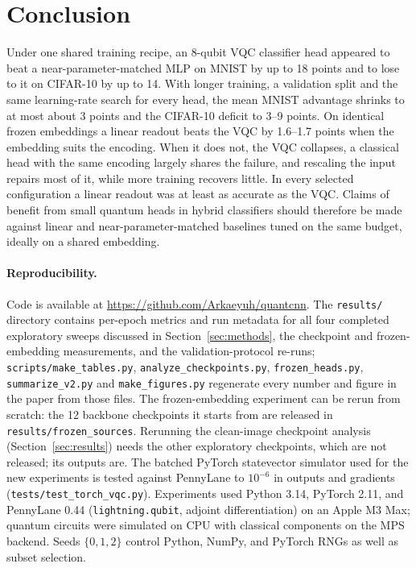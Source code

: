 \documentclass[10pt]{article}
\begin{document}
\section{Conclusion}

Under one shared training recipe, an 8-qubit VQC classifier head appeared to
beat a near-parameter-matched MLP on MNIST by up to 18 points and to lose to it
on CIFAR-10 by up to 14. With longer training, a validation split and the same
learning-rate search for every head, the mean MNIST advantage shrinks to at
most about 3 points and the CIFAR-10 deficit to 3--9 points. On identical frozen
embeddings a linear readout beats the VQC by 1.6--1.7 points when the embedding
suits the encoding. When it does not, the VQC collapses, a classical head with
the same encoding largely shares the failure, and rescaling the input repairs
most of it, while more training recovers little. In every selected configuration a linear readout was at
least as accurate as the VQC. Claims of benefit from small quantum heads in hybrid classifiers should
therefore be made against linear and near-parameter-matched baselines tuned on
the same budget, ideally on a shared embedding.

\paragraph{Reproducibility.}
Code is available at \url{https://github.com/Arkaeyuh/quantcnn}. The
\texttt{results/} directory contains per-epoch metrics and run metadata for
all four completed exploratory sweeps discussed in Section~\ref{sec:methods}, the
checkpoint and frozen-embedding measurements, and the validation-protocol
re-runs; \texttt{scripts/make\_tables.py}, \texttt{analyze\_checkpoints.py},
\texttt{frozen\_heads.py}, \texttt{summarize\_v2.py} and
\texttt{make\_figures.py} regenerate every number and figure in the paper from
those files. The frozen-embedding experiment can be rerun from scratch: the 12
backbone checkpoints it starts from are released in
\texttt{results/frozen\_sources}. Rerunning the clean-image checkpoint analysis
(Section~\ref{sec:results}) needs the other
exploratory checkpoints, which are not released; its outputs are. The batched PyTorch statevector simulator
used for the new experiments is tested against PennyLane to $10^{-6}$ in outputs
and gradients (\texttt{tests/test\_torch\_vqc.py}). Experiments used Python 3.14,
PyTorch 2.11, and PennyLane 0.44 (\texttt{lightning.qubit}, adjoint
differentiation) on an Apple M3 Max; quantum circuits were simulated on CPU
with classical components on the MPS backend. Seeds $\{0, 1, 2\}$ control
Python, NumPy, and PyTorch RNGs as well as subset selection.
\end{document}
